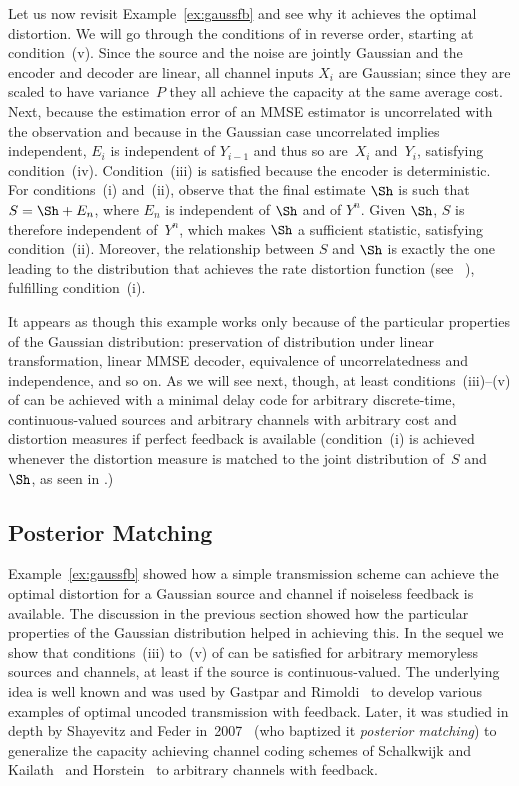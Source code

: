 Let us now revisit Example~\ref{ex:gaussfb} and see why it achieves the optimal
distortion. We will go through the conditions of 
in reverse order, starting at condition~(v). Since the source and the noise are
jointly Gaussian and the encoder and decoder are linear, all channel inputs
$X_i$ are Gaussian; since they are scaled to have variance~$P$ they all achieve
the capacity at the same average cost. Next, because the estimation error of an
MMSE estimator is uncorrelated with the observation and because in the Gaussian
case uncorrelated implies independent, $E_i$ is independent of $Y_{i-1}$ and
thus so are~$X_i$ and~$Y_i$, satisfying condition~(iv). Condition~(iii) is
satisfied because the encoder is deterministic. For conditions~(i) and~(ii),
observe that the final estimate $\Sh$ is such that $S = \Sh + E_n$, where $E_n$
is independent of $\Sh$ and of $Y^n$. Given $\Sh$, $S$ is therefore independent
of~$Y^n$, which makes $\Sh$ a sufficient statistic, satisfying condition~(ii).
Moreover, the relationship between $S$ and $\Sh$ is exactly the one leading to
the distribution that achieves the rate distortion function (see
\eg~\cite[Theorem~10.3.2]{CoverT1991}), fulfilling condition~(i).

It appears as though this example works only because of the particular
properties of the Gaussian distribution: preservation of distribution under
linear transformation, linear MMSE decoder, equivalence of uncorrelatedness and
independence, and so on. As we will see next, though, at least
conditions~(iii)--(v) of  can be achieved with a minimal delay
code for arbitrary discrete-time, continuous-valued sources and arbitrary
channels with arbitrary cost and distortion measures if perfect feedback is
available (condition~(i) is achieved whenever the distortion measure is matched
to the joint distribution of~$S$ and~$\Sh$, as seen in .)


\subsection{Posterior Matching}

Example~\ref{ex:gaussfb} showed how a simple transmission scheme can achieve the
optimal distortion for a Gaussian source and channel if noiseless feedback is
available. The discussion in the previous section showed how the particular
properties of the Gaussian distribution helped in achieving this. In the sequel
we show that conditions~(iii) to~(v) of
 can be satisfied for arbitrary memoryless sources and channels,
at least if the source is continuous-valued.  The underlying idea is well known
and was used by Gastpar and Rimoldi~\cite{GastparR2003} to develop various
examples of optimal uncoded transmission with feedback.
Later, it was studied in depth by Shayevitz and Feder
in~2007~\cite{ShayevitzF2007,ShayevitzF2008} (who baptized it \emph{posterior
matching}) to generalize the capacity achieving channel coding schemes of
Schalkwijk and Kailath~\cite{SchalkwijkK1966} and Horstein~\cite{Horstein1963}
to arbitrary channels with feedback.

